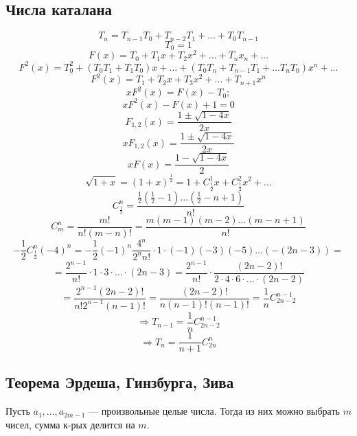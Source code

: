 \subsection{Числа каталана}
\[
T_n = T_{n - 1}T_0 + T_{n - 2} T_1 + \ldots + T_0 T_{n - 1}
\]
\[
T_0 = 1
\]
\[
F(x) = T_0  + T_1x + T_2 x^{2} + \ldots + T_{n} x_n + \ldots
\]
\[
F^{2}(x) = T_0^{2} + (T_0T_1 + T_1T_0)x + \ldots + (T_0T_n + T_{n - 1}T_1 + \ldots T_n T_0) x^{n} + \ldots
\]
\[
F^{2}(x) = T_1 + T_2x + T_3x^{2} + \ldots + T_{n + 1}x^{n}
\]
\[
xF^{2}(x) = F(x) - T_0;
\]
\[
xF^{2}(x) - F(x) + 1 = 0
\]
\[
F_{1, 2}(x) = \frac{1 \pm \sqrt{1 - 4x}}{2x}
\]
\[
xF_{1, 2}(x) = \frac{1 \pm \sqrt{1 - 4x}}{2x}
\]
\[
xF(x) = \frac{1 - \sqrt{1 - 4x}}{2}
\]
\[
\sqrt{1 + x} = (1 + x)^{\frac{1}{2}} = 1 + C_{\frac{1}{2}}^{1} x + C_{\frac{1}{2}}^{2} x^{2} + \ldots
\]
\[
C_{\frac{1}{2}}^{n} = \frac{\frac{1}{2}\left(\frac{1}{2} - 1\right)\ldots\left(\frac{1}{2} - n + 1\right)}{n!}
\]
\[
C_{m}^{n} = \frac{m!}{n!(m - n)!} = \frac{m(m - 1)(m - 2)\ldots(m - n + 1)}{n!}
\]
\[
-\frac{1}{2} C_{\frac{1}{2}}^{n} (-4)^{n} = -\frac{1}{2} (-1)^{n} \frac{4^{n}}{2^{n}n!} \cdot 1 \cdot (-1) (-3) (-5) \ldots (-(2n - 3)) = 
\]
\[
 = \frac{2^{n - 1}}{n!} \cdot 1 \cdot 3 \cdot \ldots \cdot (2n - 3) = \frac{2^{n - 1}}{n!} \cdot \frac{(2n - 2)!}{2 \cdot 4 \cdot 6 \cdot \ldots \cdot (2n - 2)}
\]
\[
 = \frac{2^{n - 1}(2n - 2)!}{n! 2^{n - 1}(n - 1)!} = \frac{(2n - 2)!}{n (n - 1)! (n - 1)!}  = \frac{1}{n} C_{2n - 2}^{n - 1}
\]
\[
 \Rightarrow T_{n - 1} = \frac{1}{n} C_{2n - 2}^{n - 1}
\]
\[
  \Rightarrow T_n = \frac{1}{n + 1} C_{2n}^{n}
\]
\subsection{Теорема Эрдеша, Гинзбурга, Зива}
\begin{theorem}
\label{th:erdesh-ginsburg-ziva-14}
Пусть $a_1, \ldots, a_{2m - 1}$ --- произвольные целые числа. Тогда из них можно выбрать $m$ чисел, сумма к-рых делится на $m$.
\end{theorem}

